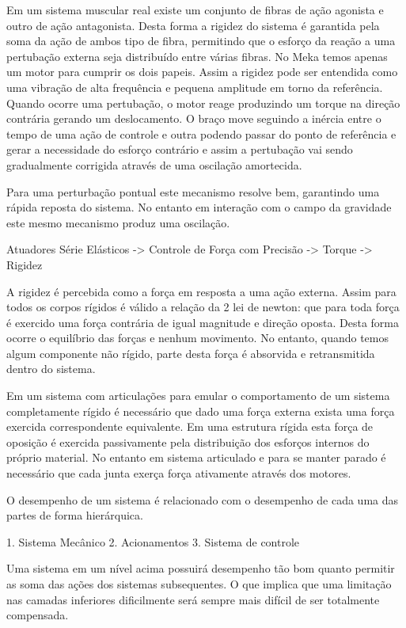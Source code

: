Em um sistema muscular real existe um conjunto de fibras de ação agonista e outro de ação antagonista. Desta forma a rigidez do sistema é garantida pela soma da ação de ambos tipo de fibra, permitindo que o esforço da reação a uma pertubação externa seja distribuído entre várias fibras. No Meka temos apenas um motor para cumprir os dois papeis. Assim a rigidez pode ser entendida como uma vibração de alta frequência e pequena amplitude em torno da referência. Quando ocorre uma pertubação, o motor reage produzindo um torque na direção contrária gerando um deslocamento. O braço move seguindo a inércia entre o tempo de uma ação de controle e outra podendo passar do ponto de referência e gerar a necessidade do esforço contrário e assim a pertubação vai sendo gradualmente corrigida através de uma oscilação amortecida.

Para uma perturbação pontual este mecanismo resolve bem, garantindo uma rápida reposta do sistema. No entanto em interação com o campo da gravidade este mesmo mecanismo produz uma oscilação.

Atuadores Série Elásticos
 -> Controle de Força com Precisão
 -> Torque
 -> Rigidez
 
A rigidez é percebida como a força em resposta a uma ação externa. Assim para todos os corpos rígidos é válido a relação da 2 lei de newton: que para toda força é exercido uma força contrária de igual magnitude e direção oposta. Desta forma ocorre o equilíbrio das forças e nenhum movimento. No entanto, quando temos algum componente não rígido, parte desta força é absorvida e retransmitida dentro do sistema. 

Em um sistema com articulações para emular o comportamento de um sistema completamente rígido é necessário que dado uma força externa exista uma força exercida correspondente equivalente. Em uma estrutura rígida esta força de oposição é exercida passivamente pela distribuição dos esforços internos do próprio material. No entanto em sistema articulado e para se manter parado é necessário que cada junta exerça força ativamente através dos motores.

O desempenho de um sistema é relacionado com o desempenho de cada uma das partes de forma hierárquica. 

1. Sistema Mecânico
2. Acionamentos
3. Sistema de controle

Uma sistema em um nível acima possuirá desempenho tão bom quanto permitir as soma das ações dos sistemas subsequentes. O que implica que uma limitação nas camadas inferiores dificilmente será sempre mais difícil de ser totalmente compensada.

